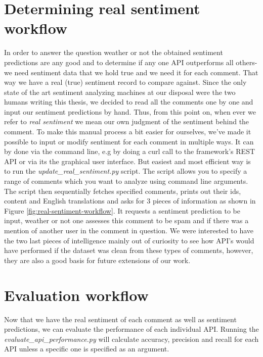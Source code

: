 \section{Determining real sentiment workflow\label{sec:determining-real-sentiment-workflow}}
In order to answer the question weather or not the obtained sentiment predictions are any good and to determine if any one API outperforms all others- we need sentiment data that we hold true and we need it for each comment. That way we have a real (true) sentiment record to compare against.
Since the only state of the art sentiment analyzing machines at our disposal were the two humans writing this thesis, we decided to read all the comments one by one and input our sentiment predictions by hand. 
Thus, from this point on, when ever we refer to \textit{real sentiment} we mean our own judgment of the sentiment behind the comment.
To make this manual process  a bit easier for ourselves, we've made it possible to input or modify sentiment for each comment in multiple ways. It can by done via the command line, e.g by doing a curl call to the framework's REST API or via its the graphical user interface. 
But easiest and most efficient way is to run the \textit{update\_real\_sentiment.py} script. The script allows you to specify a range of comments which you want to analyze using command line arguments.
The script then sequentially fetches specified comments, prints out their ids, content and English translations and asks for 3 pieces of information as shown in Figure \ref{fig:real-sentiment-workflow}. It requests a sentiment prediction to be input, weather or not one assesses this comment to be spam and if there was a mention of another user in the comment in question. 
We were interested to have the two last pieces of intelligence mainly out of curiosity to see how API's would have performed if the dataset was clean from these types of comments, however, they are also a good basis for future extensions of our work. 




\section{Evaluation workflow\label{sec:sentiment-evaluation-workflow}}
Now that we have the real sentiment of each comment as well as sentiment predictions, we can evaluate the performance of each individual API. Running the \textit{evaluate\_api\_performance.py} will calculate accuracy, precision and recall for each API unless a specific one is specified as an argument. 
